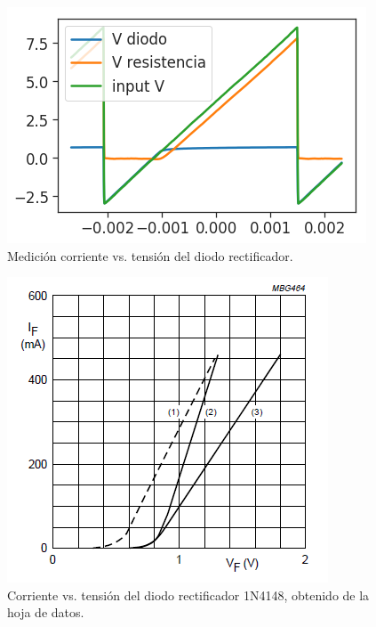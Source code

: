 \begin{figure}[!ht]
\centering
\includegraphics[scale=0.45]{../EJ1/DiodoRectificador/datosOsciloscopio}
\caption{Medici\'on corriente vs. tensi\'on del diodo rectificador.}
\label{med3b}
\end{figure}

\begin{figure}[!ht]
\centering
\includegraphics[scale=0.45]{../EJ1/DiodoRectificador/corrienteDiodoDatasheet}
\caption{Corriente vs. tensi\'on del diodo rectificador 1N4148, obtenido de la hoja de datos.}
\label{med3c}
\end{figure}
